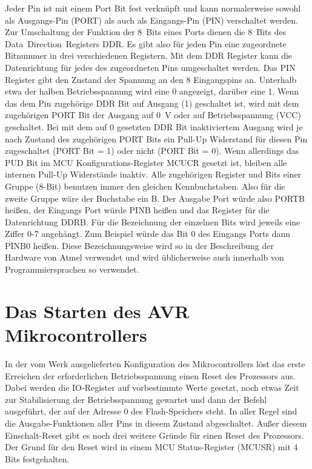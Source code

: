Jeder Pin ist mit einem Port Bit fest verknüpft und kann normalerweise sowohl
als Ausgangs-Pin (PORT) als auch als Eingangs-Pin (PIN) verschaltet werden.
Zur Umschaltung der Funktion der 8~Bits eines Ports dienen die 8~Bits des
Data~Direction~Registers DDR.
Es gibt also für jeden Pin eine zugeordnete Bitnummer in drei verschiedenen
Registern. Mit dem DDR Register kann die Datenrichtung für jedes des zugeordneten
Pins umgeschaltet werden. Das PIN Register gibt den Zustand der Spannung an
den 8 Eingangspins an. Unterhalb etwa der halben Betriebsspannung wird eine
0 angezeigt, darüber eine 1. Wenn das dem Pin zugehörige DDR Bit auf Ausgang (1)
geschaltet ist, wird mit dem zugehörigen PORT Bit der Ausgang auf 0~V oder
auf Betriebsspannung (VCC) geschaltet. 
Bei mit dem auf 0 gesetzten DDR Bit inaktiviertem Ausgang wird je nach Zustand
des zugehörigen PORT Bits ein Pull-Up Widerstand für diesen Pin zugeschaltet
(PORT Bit = 1) oder nicht (PORT Bit = 0). Wenn allerdings das PUD Bit im
MCU Konfigurations-Register MCUCR gesetzt ist, bleiben alle internen Pull-Up
Widerstände inaktiv.
Alle zugehörigen Register und Bits einer Gruppe (8-Bit) benutzen immer den
gleichen Kennbuchstaben. Also für die zweite Gruppe wäre der Buchstabe ein B.
Der Ausgabe Port würde also PORTB heißen, der Eingangs Port würde PINB heißen
und das Register für die Datenrichtung DDRB. Für die Bezeichnung der einzelnen
Bits wird jeweils eine Ziffer 0-7 angehängt. Zum Beispiel würde das Bit 0
des Eingangs Ports dann PINB0 heißen.
Diese Bezeichnungsweise wird so in der Beschreibung der Hardware von Atmel verwendet
und wird üblicherweise auch innerhalb von Programmiersprachen so verwendet.

\section{Das Starten des AVR Mikrocontrollers}

In der vom Werk ausgelieferten Konfiguration des Mikrocontrollers löst das erste 
Erreichen der erforderlichen Betriebsspannung einen Reset des Prozessors aus.
Dabei werden die IO-Register auf vorbestimmte Werte gesetzt, noch etwas Zeit
zur Stabilisierung der Betriebsspannung gewartet und dann der Befehl ausgeführt,
der auf der Adresse 0 des Flash-Speichers steht.
In aller Regel sind die Ausgabe-Funktionen aller Pins in diesem Zustand abgeschaltet.
Außer diesem Einschalt-Reset gibt es noch drei weitere Gründe für einen Reset
des Prozessors. Der Grund für den Reset wird in einem MCU Status-Register (MCUSR)
mit 4 Bits festgehalten.

